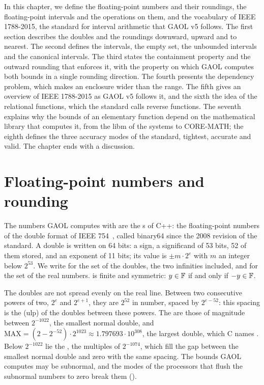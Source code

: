 \documentclass[12pt,a4paper,twoside,openright]{book}
\begin{document}
\medskip
In this chapter, we define the floating-point numbers and their roundings,
the floating-point intervals and the operations on them, and the vocabulary
of IEEE 1788-2015, the standard for interval arithmetic that GAOL v5
follows. The first section describes the doubles and the roundings
downward, upward and to nearest. The second defines the intervals, the
empty set, the unbounded intervals and the canonical intervals. The third
states the containment property and the outward rounding that enforces it,
with the property on which GAOL computes both bounds in a single rounding
direction. The fourth presents the dependency problem, which makes an
enclosure wider than the range. The fifth gives an overview of IEEE
1788-2015 as GAOL v5 follows it, and the sixth the idea of the relational
functions, which the standard calls reverse functions. The seventh explains
why the bounds of an elementary function depend on the mathematical library
that computes it, from the libm of the systems to CORE-MATH; the eighth
defines the three accuracy modes of the standard, tightest, accurate and
valid. The chapter ends with a discussion.

\section{Floating-point numbers and rounding}\label{sec:rounding-definitions}
%

The numbers GAOL computes with are the s of C++: the
floating-point numbers of the double format of IEEE
754~\cite{IEEE754:90,Goldberg:01}, called binary64 since the 2008 revision
of the standard. A double is written on 64 bits: a sign, a significand of
53 bits, 52 of them stored, and an exponent of 11 bits; its value is
$\pm m\cdot2^{e}$ with $m$ an integer below $2^{53}$. We write \FSet{} for
the set of the doubles, the two infinities included, and \RSet{} for the set
of the real numbers. \FSet{} is finite and symmetric: $y\in\mathbb{F}$ if and
only if $-y\in\mathbb{F}$.

\medskip
The doubles are not spread evenly on the real line. Between two consecutive
powers of two, $2^{e}$ and $2^{e+1}$, they are $2^{52}$ in number, spaced by
$2^{e-52}$: this spacing is the  (ulp) of the
doubles between these powers. The  are those of
magnitude between $2^{-1022}$, the smallest normal double, and
$\mathrm{MAX}=(2-2^{-52})\cdot2^{1023}\approx1.797693\cdot10^{308}$, the
largest double, which C names . Below $2^{-1022}$ lie the
, the multiples of $2^{-1074}$, which fill the gap
between the smallest normal double and zero with the same spacing. The
bounds GAOL computes may be subnormal, and the modes of the processors that
flush the subnormal numbers to zero break them ().
%
\end{document}
